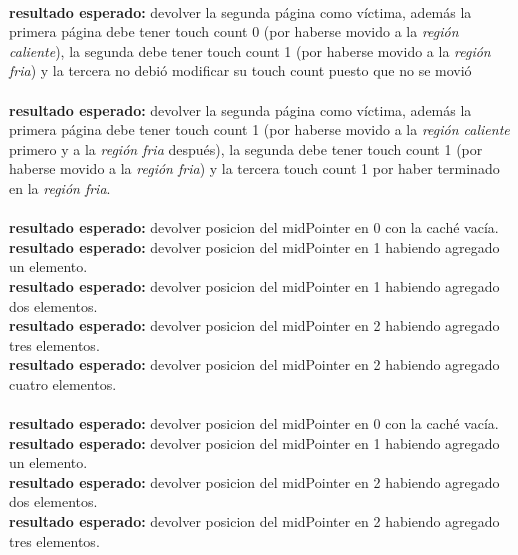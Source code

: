 \documentclass[11pt, a4paper, spanish]{article}
\begin{document}
\\
\textbf{resultado esperado:} devolver la segunda p\'agina como v\'ictima, adem\'as la primera p\'agina debe tener touch count 0 (por haberse movido
a la \textit{regi\'on caliente}), la segunda debe tener touch count 1 (por haberse movido a la \textit{regi\'on fria}) y la tercera no debi\'o
modificar su touch count puesto que no se movi\'o\\

\\
\textbf{resultado esperado:} devolver la segunda p\'agina como v\'ictima, adem\'as la primera p\'agina debe tener touch count 1 (por haberse movido
a la \textit{regi\'on caliente} primero y a la \textit{regi\'on fria} despu\'es), la segunda debe tener touch count 1 (por haberse movido a la 
\textit{regi\'on fria}) y la tercera touch count 1 por haber terminado en la  \textit{regi\'on fria}.\\

\\
\textbf{resultado esperado:} devolver posicion del midPointer en 0 con la cach\'e vac\'ia.\\
\textbf{resultado esperado:} devolver posicion del midPointer en 1 habiendo agregado un elemento.\\
\textbf{resultado esperado:} devolver posicion del midPointer en 1 habiendo agregado dos elementos.\\
\textbf{resultado esperado:} devolver posicion del midPointer en 2 habiendo agregado tres elementos.\\
\textbf{resultado esperado:} devolver posicion del midPointer en 2 habiendo agregado cuatro elementos.\\

\\
\textbf{resultado esperado:} devolver posicion del midPointer en 0 con la cach\'e vac\'ia.\\
\textbf{resultado esperado:} devolver posicion del midPointer en 1 habiendo agregado un elemento.\\
\textbf{resultado esperado:} devolver posicion del midPointer en 2 habiendo agregado dos elementos.\\
\textbf{resultado esperado:} devolver posicion del midPointer en 2 habiendo agregado tres elementos.\\
\end{document}
